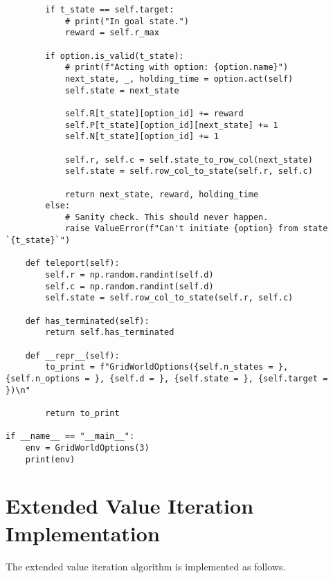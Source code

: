 \begin{verbatim}
        if t_state == self.target:
            # print("In goal state.")
            reward = self.r_max

        if option.is_valid(t_state):
            # print(f"Acting with option: {option.name}")
            next_state, _, holding_time = option.act(self)
            self.state = next_state

            self.R[t_state][option_id] += reward
            self.P[t_state][option_id][next_state] += 1
            self.N[t_state][option_id] += 1

            self.r, self.c = self.state_to_row_col(next_state)
            self.state = self.row_col_to_state(self.r, self.c)

            return next_state, reward, holding_time
        else:
            # Sanity check. This should never happen.
            raise ValueError(f"Can't initiate {option} from state `{t_state}`")

    def teleport(self):
        self.r = np.random.randint(self.d)
        self.c = np.random.randint(self.d)
        self.state = self.row_col_to_state(self.r, self.c)

    def has_terminated(self):
        return self.has_terminated

    def __repr__(self):
        to_print = f"GridWorldOptions({self.n_states = }, {self.n_options = }, {self.d = }, {self.state = }, {self.target = })\n"

        return to_print

if __name__ == "__main__":
    env = GridWorldOptions(3)
    print(env)
\end{verbatim}

\chapter{Extended Value Iteration Implementation}

The extended value iteration algorithm is implemented as follows.

